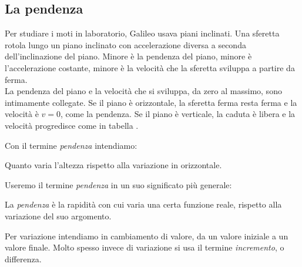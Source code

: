 \subsection{La pendenza}
\label{subsec:differenziazione_pendenza}
Per studiare i moti in laboratorio, Galileo usava piani inclinati. 
Una sferetta rotola lungo un piano inclinato con accelerazione diversa a 
seconda dell'inclinazione del piano. 
Minore è la pendenza del piano, minore è l'accelerazione costante, 
minore è la velocità che la sferetta sviluppa a partire da ferma. \\
La pendenza del piano e la velocità che si sviluppa, da zero al massimo, 
sono intimamente collegate. 
Se il piano è orizzontale, la sferetta ferma resta ferma e la velocità è 
\(v=0\), come la pendenza. 
Se il piano è verticale, la caduta è libera e la velocità progredisce 
come in tabella
.

Con il termine \emph{pendenza} intendiamo:
\begin{definizione}
Quanto varia l'altezza rispetto alla variazione in orizzontale. 
\end{definizione}


Useremo il termine \emph{pendenza} in un suo significato più generale:
\begin{definizione}
La \emph{pendenza} è la rapidità con cui varia una certa funzione reale, 
rispetto alla variazione del suo argomento. 
\end{definizione}

Per variazione intendiamo in cambiamento di valore, da un valore iniziale a 
un valore finale. 
Molto spesso invece di variazione si usa il termine \emph{incremento}, o 
differenza.

